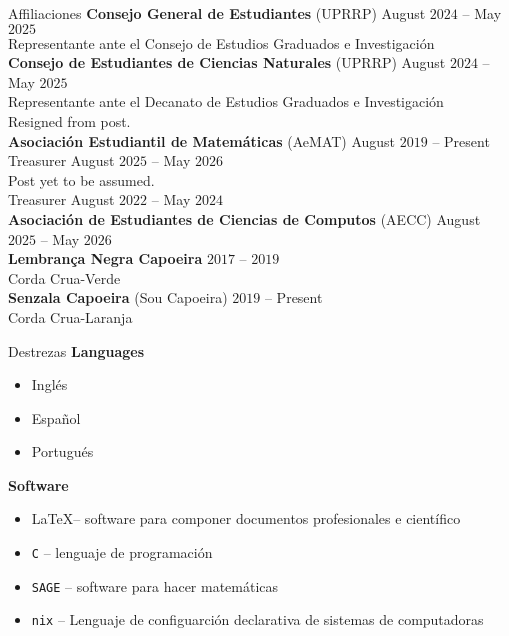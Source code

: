 \documentclass{resume}
\begin{document}
\begin{rSection}{Affiliaciones}
  \textbf{Consejo General de Estudiantes} (UPRRP)
            \hfill August $2024$ -- May $2025$  \\
  Representante ante el Consejo de Estudios Graduados e
  Investigaci\'on \\

  \textbf{Consejo de Estudiantes de Ciencias Naturales} (UPRRP)
            \hfill August $2024$ -- May $2025$  \\
  Representante ante el Decanato de Estudios Graduados e
  Investigaci\'on \\
  {\footnotesize Resigned from post}.  \\

  \textbf{Asociaci\'on Estudiantil de Matem\'aticas} (AeMAT)
            \hfill August $2019$ -- Present \\
    Treasurer \hfill August $2025$ -- May $2026$ \\
    {\footnotesize Post yet to be assumed}.  \medskip \\
    Treasurer \hfill August $2022$ -- May $2024$ \\

  \textbf{Asociaci\'on de Estudiantes de Ciencias de Computos} (AECC)
            \hfill August $2025$ -- May  $2026$ \\

  \textbf{Lembran\c{c}a Negra Capoeira} \hfill $2017$ -- $2019$ \\
  Corda Crua-Verde  \\

  \textbf{Senzala Capoeira} (Sou Capoeira) \hfill $2019$ -- Present \\
  Corda Crua-Laranja  \\
\end{rSection}

\begin{rSection}{Destrezas}
  \textbf{Languages}
  \begin{itemize}
    \item[] Ingl\'es

    \item[] Espa\~nol

    \item[] Portugu\'es
  \end{itemize}

  \textbf{Software}
  \begin{itemize}
    \item[] \LaTeX -- software para componer documentos profesionales
      e cient\'ifico

    \item[] \lstinline{C} -- lenguaje de programaci\'on

    \item[] \lstinline{SAGE} -- software para hacer matem\'aticas

    \item[] \lstinline{nix} -- Lenguaje de configuarci\'on declarativa
      de sistemas de computadoras
  \end{itemize}
\end{rSection}
\end{document}
